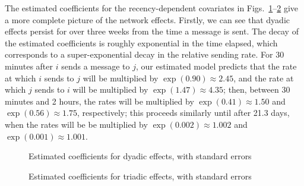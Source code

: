 \documentclass[final]{statsoc}
\begin{document}
The estimated coefficients for the recency-dependent covariates in
Figs.~\ref{F:enron-dyad}--\ref{F:enron-triad} give a more complete
picture of the network effects.  Firstly, we can see that dyadic effects
persist for over three weeks from the time a message is sent.  The decay of
the estimated coefficients is roughly exponential in the time elapsed, which
corresponds to a super-exponential decay in the relative sending rate.  For 30
minutes after $i$ sends a message to $j$, our estimated model predicts that
the rate at which $i$ sends to $j$ will be multiplied by $\exp(0.90) \approx
2.45$, and the rate at which $j$ sends to $i$ will be multiplied by $\exp(1.47)
\approx 4.35$; then, between 30 minutes and 2 hours, the rates will be
multiplied by $\exp(0.41) \approx 1.50$ and $\exp(0.56) \approx 1.75$,
respectively; this proceeds similarly until after 21.3 days, when the rates
will be be multiplied by $\exp(0.002) \approx 1.002$ and $\exp(0.001) \approx
1.001$.
\begin{figure}
  \centering
  \caption{Estimated coefficients for dyadic effects, with standard errors}
  \label{F:enron-dyad}
\end{figure}

\begin{figure}
  \centering
  \caption{Estimated coefficients for triadic effects, with standard errors}
  \label{F:enron-triad}
\end{figure}
\end{document}
